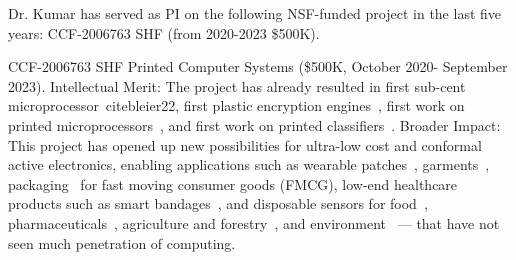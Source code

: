\color{red}
Dr. Kumar has served as PI on the following NSF-funded project in
the last five years: CCF-2006763 SHF (from 2020-2023 \$500K).

CCF-2006763 SHF Printed Computer Systems (\$500K, October 2020- September
2023). Intellectual Merit: The project has already resulted in first sub-cent
microprocessor~cite{bleier22}, first plastic encryption
engines~\cite{bleier23}, first work on printed
microprocessors~\cite{bleier2020printed}, and first work on printed
classifiers~\cite{mubarik20}. Broader Impact: This project has opened up new
possibilities for ultra-low cost and conformal active electronics, enabling
applications such as wearable patches~\cite{8502791},
garments~\cite{garments},
packaging~\cite{gethin2013printed} for fast
moving consumer goods (FMCG), low-end healthcare products such as smart
bandages~\cite{DERAKHSHANDEH20181259},
and disposable sensors for food~\cite{7994325},
pharmaceuticals~\cite{BERGAMINI200554},
agriculture and forestry~\cite{chemosensors8040125},
and environment~\cite{MARRAZZA1999297} --- that have not seen much
penetration of computing.
\color{black}
